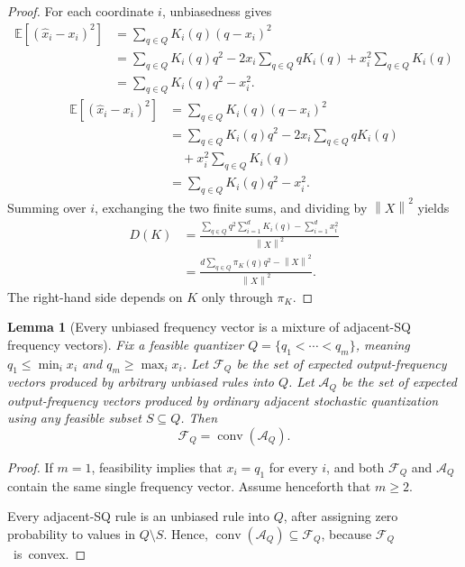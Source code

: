 \documentclass[11pt,letterpaper]{article}
\newtheorem{lemma}{Lemma}
\newcommand{\norm}[1]{\left\lVert#1\right\rVert}
\newcommand{\E}{\mathbb{E}}
\begin{document}
{\begin{proof}
For each coordinate $i$, unbiasedness gives
\ifarxiv
\begin{align*}
\E[(\widehat{x}_i-x_i)^2]
&=\sum_{q\in Q}K_i(q)(q-x_i)^2\\
&=\sum_{q\in Q}K_i(q)q^2
  -2x_i\sum_{q\in Q}qK_i(q)
  +x_i^2\sum_{q\in Q}K_i(q)\\
&=\sum_{q\in Q}K_i(q)q^2-x_i^2.
\end{align*}
\else
\begin{align*}
\E[(\widehat{x}_i-x_i)^2]
&=\sum_{q\in Q}K_i(q)(q-x_i)^2\\
&=\sum_{q\in Q}K_i(q)q^2
  -2x_i\sum_{q\in Q}qK_i(q)\\
&\quad+x_i^2\sum_{q\in Q}K_i(q)\\
&=\sum_{q\in Q}K_i(q)q^2-x_i^2.
\end{align*}
\fi
Summing over $i$, exchanging the two finite sums, and dividing by
$\norm{X}^2$ yields
\begin{align*}
D(K)&=\frac{\sum_{q\in Q}q^2\sum_{i=1}^d K_i(q)-\sum_{i=1}^d x_i^2}{\norm{X}^2}\\&=\frac{
d\sum_{q\in Q}\pi_K(q)q^2-\norm{X}^2}{\norm{X}^2}.
\end{align*}
The right-hand side depends on $K$ only through $\pi_K$.
\end{proof}

\begin{lemma}[Every unbiased frequency vector is a mixture of adjacent-SQ
frequency vectors]\label{lem:timesharing-frequency-convex-hull}
Fix a feasible quantizer $Q=\{q_1<\cdots<q_m\}$, meaning
$q_1\le\min_i x_i$ and $q_m\ge\max_i x_i$. Let $\mathcal{F}_Q$ be the set of
expected output-frequency vectors produced by arbitrary unbiased rules into
$Q$. Let $\mathcal{A}_Q$ be the set of expected output-frequency vectors
produced by ordinary adjacent stochastic quantization using any feasible
subset $S\subseteq Q$. Then
\[
\mathcal{F}_Q=\operatorname{conv}(\mathcal{A}_Q).
\]
\end{lemma}

\begin{proof}
If $m=1$, feasibility implies that $x_i=q_1$ for every $i$, and both
$\mathcal{F}_Q$ and $\mathcal{A}_Q$ contain the same single frequency vector.
Assume henceforth that $m\ge2$.

Every adjacent-SQ rule is an unbiased rule into $Q$, after assigning zero
probability to values in $Q\setminus S$. Hence,
$\operatorname{conv}(\mathcal{A}_Q)\subseteq\mathcal{F}_Q$, because
\mbox{$\mathcal{F}_Q$ is convex.}


\end{proof}}
\end{document}
